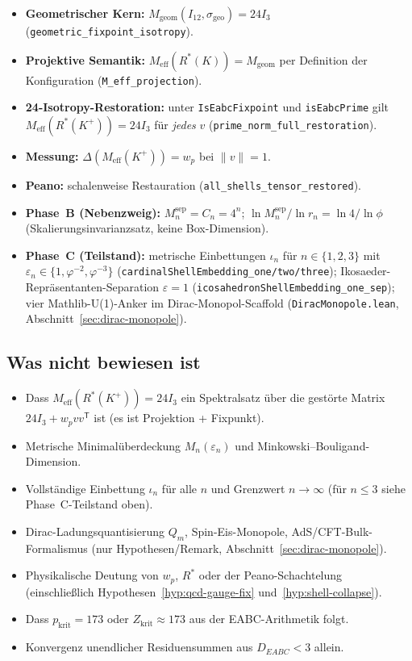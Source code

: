 \documentclass[11pt,a4paper]{article}
\begin{document}
	\begin{itemize}
		\item \textbf{Geometrischer Kern:}
		$M_{\mathrm{geom}}(I_{12},\sigma_{\mathrm{geo}})=24I_3$
		(\texttt{geometric\_fixpoint\_isotropy}).
		\item \textbf{Projektive Semantik:}
		$M_{\mathrm{eff}}(R^*(K))=M_{\mathrm{geom}}$ per Definition der Konfiguration
		(\texttt{M\_eff\_projection}).
		\item \textbf{24-Isotropy-Restoration:}
		unter \texttt{IsEabcFixpoint} und \texttt{isEabcPrime} gilt
		$M_{\mathrm{eff}}(R^*(K^+))=24I_3$ für \emph{jedes} $v$
		(\texttt{prime\_norm\_full\_restoration}).
		\item \textbf{Messung:} $\Delta(M_{\mathrm{eff}}(K^+))=w_p$ bei $\|v\|=1$.
		\item \textbf{Peano:} schalenweise Restauration (\texttt{all\_shells\_tensor\_restored}).
		\item \textbf{Phase~B (Nebenzweig):}
		$M_n^{\mathrm{sep}}=C_n=4^n$;
		$\ln M_n^{\mathrm{sep}}/\ln r_n=\ln4/\ln\phi$ (Skalierungsinvarianzsatz, keine Box-Dimension).
		\item \textbf{Phase~C (Teilstand):}
		metrische Einbettungen $\iota_n$ für $n\in\{1,2,3\}$ mit
		$\varepsilon_n\in\{1,\varphi^{-2},\varphi^{-3}\}$
		(\texttt{cardinalShellEmbedding\_one/two/three});
		Ikosaeder-Repräsentanten-Separation $\varepsilon=1$
		(\texttt{icosahedronShellEmbedding\_one\_sep});
		vier Mathlib-U(1)-Anker im Dirac-Monopol-Scaffold
		(\texttt{DiracMonopole.lean}, Abschnitt~\ref{sec:dirac-monopole}).
	\end{itemize}
	
	\subsection{Was nicht bewiesen ist}
	
	\begin{itemize}
		\item Dass $M_{\mathrm{eff}}(R^*(K^+))=24I_3$ ein Spektralsatz über die
		gestörte Matrix $24I_3+w_pvv^{\mathsf T}$ ist (es ist Projektion + Fixpunkt).
		\item Metrische Minimalüberdeckung $M_n(\varepsilon_n)$ und Minkowski--Bouligand-Dimension.
		\item Vollständige Einbettung $\iota_n$ für alle $n$ und Grenzwert $n\to\infty$
		(für $n\le 3$ siehe Phase~C-Teilstand oben).
		\item Dirac-Ladungsquantisierung $Q_m$, Spin-Eis-Monopole, AdS/CFT-Bulk-Formalismus
		(nur Hypothesen/Remark, Abschnitt~\ref{sec:dirac-monopole}).
		\item Physikalische Deutung von $w_p$, $R^*$ oder der Peano-Schachtelung
		(einschließlich Hypothesen~\ref{hyp:qcd-gauge-fix} und~\ref{hyp:shell-collapse}).
		\item Dass $p_{\mathrm{krit}}=173$ oder $Z_{\mathrm{krit}}\approx 173$ aus der
		EABC-Arithmetik folgt.
		\item Konvergenz unendlicher Residuensummen aus $D_{EABC}<3$ allein.
	\end{itemize}
	
\end{document}
